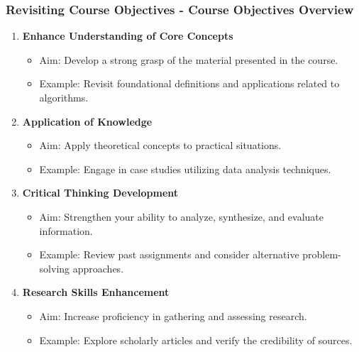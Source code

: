 \documentclass[aspectratio=169]{beamer}
\begin{document}
\begin{frame}[fragile]
    \frametitle{Revisiting Course Objectives - Course Objectives Overview}
    \begin{enumerate}
        \item \textbf{Enhance Understanding of Core Concepts}
            \begin{itemize}
                \item Aim: Develop a strong grasp of the material presented in the course.
                \item Example: Revisit foundational definitions and applications related to algorithms.
            \end{itemize}
        \item \textbf{Application of Knowledge}
            \begin{itemize}
                \item Aim: Apply theoretical concepts to practical situations.
                \item Example: Engage in case studies utilizing data analysis techniques.
            \end{itemize}
        \item \textbf{Critical Thinking Development}
            \begin{itemize}
                \item Aim: Strengthen your ability to analyze, synthesize, and evaluate information.
                \item Example: Review past assignments and consider alternative problem-solving approaches.
            \end{itemize}
        \item \textbf{Research Skills Enhancement}
            \begin{itemize}
                \item Aim: Increase proficiency in gathering and assessing research.
                \item Example: Explore scholarly articles and verify the credibility of sources.
            \end{itemize}
    \end{enumerate}
\end{frame}
\end{document}
